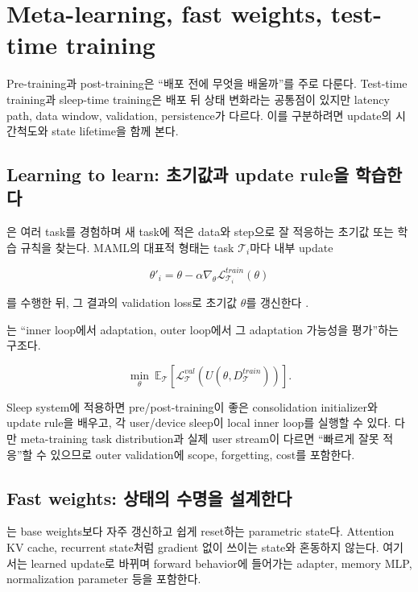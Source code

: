 \chapter{Meta-learning, fast weights, test-time training}
\label{bg:chapter-meta-ttt}

Pre-training과 post-training은 ``배포 전에 무엇을 배울까''를 주로 다룬다. Test-time training과
sleep-time training은 배포 뒤 상태 변화라는 공통점이 있지만 latency path, data window, validation,
persistence가 다르다. 이를 구분하려면 update의 시간척도와 state lifetime을 함께 본다.

\section{Learning to learn: 초기값과 update rule을 학습한다}

은 여러 task를 경험하며 새 task에 적은 data와 step으로 잘 적응하는
초기값 또는 학습 규칙을 찾는다. MAML의 대표적 형태는 task $\mathcal{T}_i$마다 내부 update

\begin{equation}
\theta'_i=\theta-\alpha\nabla_\theta
\mathcal{L}_{\mathcal{T}_i}^{train}(\theta)
\end{equation}

를 수행한 뒤, 그 결과의 validation loss로 초기값 $\theta$를 갱신한다
\parencite{finn2017maml}.

는 ``inner loop에서 adaptation, outer loop에서 그
adaptation 가능성을 평가''하는 구조다.

\begin{equation}
\min_{\theta}\ \mathbb{E}_{\mathcal{T}}
\left[\mathcal{L}^{val}_{\mathcal{T}}
\left(U(\theta,D^{train}_{\mathcal{T}})\right)\right].
\end{equation}

Sleep system에 적용하면 pre/post-training이 좋은 consolidation initializer와 update rule을 배우고,
각 user/device sleep이 local inner loop를 실행할 수 있다. 다만 meta-training task distribution과 실제
user stream이 다르면 ``빠르게 잘못 적응''할 수 있으므로 outer validation에 scope, forgetting, cost를
포함한다.

\section{Fast weights: 상태의 수명을 설계한다}

는 base weights보다 자주 갱신하고 쉽게 reset하는 parametric state다.
Attention KV cache, recurrent state처럼 gradient 없이 쓰이는 state와 혼동하지 않는다. 여기서는 learned
update로 바뀌며 forward behavior에 들어가는 adapter, memory MLP, normalization parameter 등을 포함한다.

